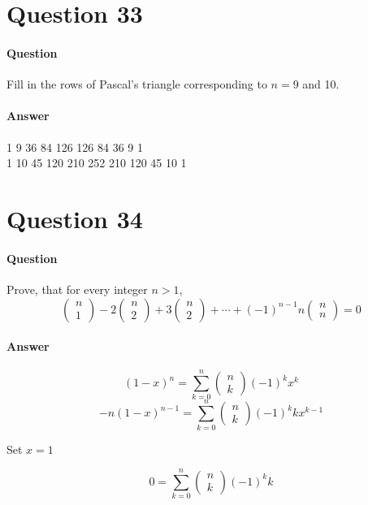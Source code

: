 \documentclass{article}
\begin{document}
\section{Question 33}
\paragraph{Question}
Fill in the rows of Pascal’s triangle corresponding to $n = 9$ and 10.
\paragraph{Answer}
\begin{center}
    1 9 36 84 126 126 84 36 9 1 \\
    1 10 45 120 210 252 210 120 45 10 1 \\
\end{center}
\section{Question 34}
\paragraph{Question}
Prove, that for every integer $n > 1$,
$$\begin{pmatrix} n \\ 1 \end{pmatrix} 
- 2\begin{pmatrix} n \\ 2 \end{pmatrix}
+ 3\begin{pmatrix} n \\ 2 \end{pmatrix}
+ \cdots +
\left( -1\right)^{n-1}n\begin{pmatrix} n \\ n \end{pmatrix}
 = 0
$$
\paragraph{Answer}
$$ \left(1-x\right)^n = \sum_{k=0}^{n}\begin{pmatrix} n \\ k \end{pmatrix} \left(-1\right)^{k} x^{k}$$
$$ -n\left(1-x\right)^{n-1} = \sum_{k=0}^{n}\begin{pmatrix} n \\ k \end{pmatrix} \left(-1\right)^{k} kx^{k-1}$$
\begin{center}
    Set $x = 1$
\end{center}
$$ 0 = \sum_{k=0}^{n}\begin{pmatrix} n \\ k \end{pmatrix} \left(-1\right)^{k} k$$
\end{document}
